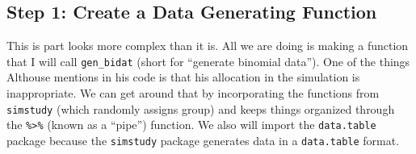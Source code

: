\documentclass[
]{book}
\begin{document}
\hypertarget{step-1-create-a-data-generating-function}{%
\subsection{Step 1: Create a Data Generating Function}\label{step-1-create-a-data-generating-function}}

This is part looks more complex than it is. All we are doing is making a function that I will call \texttt{gen\_bidat} (short for ``generate binomial data''). One of the things Althouse mentions in his code is that his allocation in the simulation is inappropriate. We can get around that by incorporating the functions from \texttt{simstudy} (which randomly assigns group) and keeps things organized through the \texttt{\%\textgreater{}\%} (known as a ``pipe'') function. We also will import the \texttt{data.table} package because the \texttt{simstudy} package generates data in a \texttt{data.table} format.
\end{document}
